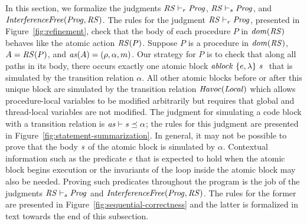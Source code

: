 In this section, we formalize the judgments $\mathit{RS} \vdash_r \mathit{Prog}$, $\mathit{RS} \vdash_s \mathit{Prog}$, and $\mathit{InterferenceFree}(\mathit{Prog},\mathit{RS})$.
The rules for the judgment $\mathit{RS} \vdash_r \mathit{Prog}$, presented in Figure~\ref{fig:refinement}, check that the body of 
each procedure $P$ in $\mathit{dom}(\mathit{RS})$ behaves like the atomic action $\mathit{RS}(P)$.  
Suppose $P$ is a procedure in $\mathit{dom}(\mathit{RS})$, $A = \mathit{RS}(P)$, and $\mathit{as}(A) = (\rho, \alpha, m)$.
Our strategy for $P$ is to check that along all paths in its body, there occurs exactly one atomic block 
$\mathit{ablock}\ {\{e,\lambda\}}\ {\mathit{s}}\ $ that is simulated by the transition relation $\alpha$.
All other atomic blocks before or after this unique block are simulated by the transition relation $\mathit{Havoc}(\mathit{Local})$ 
which allows procedure-local variables to be modified arbitrarily but requires that global and thread-local variables are not modified.
The judgment for simulating a code block with a transition relation is $\mathit{as} \vdash \mathit{s} \preceq \alpha$; the rules for this judgment 
are presented in Figure~\ref{fig:statement-summarization}.
In general, it may not be possible to prove that the body $\mathit{s}$ of the atomic block is simulated by $\alpha$.
Contextual information such as the predicate $e$ that is expected to hold when the atomic block begins execution or the invariants
of the loop inside the atomic block may also be needed.
Proving such predicates throughout the program is the job of the judgments $\mathit{RS} \vdash_s \mathit{Prog}$ and $\mathit{InterferenceFree}(\mathit{Prog}, \mathit{RS})$.
The rules for the former are presented in Figure~\ref{fig:sequential-correctness} and the latter is formalized in text towards the end of this 
subsection.

